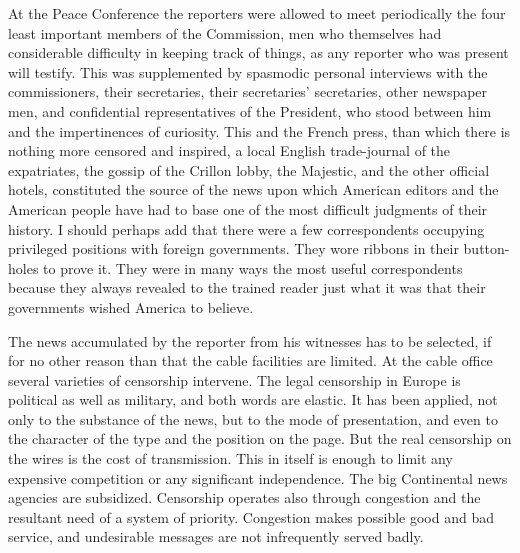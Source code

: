\documentclass[openany,nobib,twoside,nohyper]{tufte-book}
\begin{document}
At the Peace Conference the reporters were allowed to meet periodically
the four least important members of the Commission, men who themselves
had considerable difficulty in keeping track of things, as any reporter
who was present will testify. This was supplemented by spasmodic
personal interviews with the commissioners, their secretaries, their
secretaries' secretaries, other newspaper men, and confidential
representatives of the President, who stood between him and the
impertinences of curiosity. This and the French press, than which there
is nothing more censored and inspired, a local English trade-journal of
the expatriates, the gossip of the Crillon lobby, the Majestic, and the
other official hotels, constituted the source of the news upon which
American editors and the American people have had to base one of the
most difficult judgments of their history. I should perhaps add that
there were a few correspondents occupying privileged positions with
foreign governments. They wore ribbons in their button-holes to prove
it. They were in many ways the most useful correspondents because they
always revealed to the trained reader just what it was that their
governments wished America to believe.

The news accumulated by the reporter from his witnesses has to be
selected, if for no other reason than that the cable facilities are
limited. At the cable office several varieties of censorship intervene.
The legal censorship in Europe is political as well as military, and
both words are elastic. It has been applied, not only to the substance
of the news, but to the mode of presentation, and even to the character
of the type and the position on the page. But the real censorship on the
wires is the cost of transmission. This in itself is enough to limit any
expensive competition or any significant independence. The big
Continental news agencies are subsidized. Censorship operates also
through congestion and the resultant need of a system of priority.
Congestion makes possible good and bad service, and undesirable messages
are not infrequently served badly.
\end{document}

